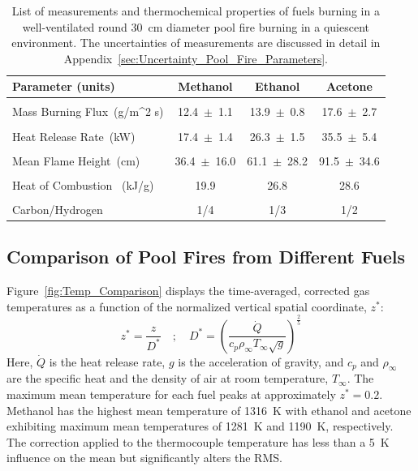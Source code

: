 \documentclass[12pt]{article}
\begin{document}
\begin{table}[!ht]
\caption{List of measurements and thermochemical properties of fuels burning in a well-ventilated round 30~cm diameter pool fire burning in a quiescent environment. The uncertainties of measurements are discussed in detail in Appendix~\ref{sec:Uncertainty_Pool_Fire_Parameters}.}
\label{tab:Pool_Fire_Parameters_Table}
\centering
	\footnotesize
	\begin{tabular}{lccc}
\hline
\textbf{Parameter (units)} &\textbf{Methanol}& \textbf{Ethanol}& \textbf{Acetone}\\
\hline
\\[0.01cm]
Mass Burning Flux~(\si{g/{m^2 s}})		&	12.4~$\pm$~1.1		&	13.9~$\pm$~0.8	&	17.6~$\pm$~2.7\\
\\[0.01cm]
Heat Release Rate~(\si{kW})			&	17.4~$\pm$~1.4		&	26.3~$\pm$~1.5	&	35.5~$\pm$~5.4\\
\\[0.01cm]
Mean Flame Height~(\si{cm})			&	36.4~$\pm$~16.0		&	61.1~$\pm$~28.2	&	91.5~$\pm$~34.6\\
\\[0.01cm]
Heat of Combustion~ (\si{kJ/g})			&	19.9				&	26.8			&	28.6			\\	
\\[0.01cm]
Carbon/Hydrogen 					&	1/4			&	1/3		&	1/2			\\
\hline
\end{tabular}
\end{table}

\subsection{Comparison of Pool Fires from Different Fuels}
\label{ssec:Fuel_comp}

Figure~\ref{fig:Temp_Comparison} displays the time-averaged, corrected gas temperatures as a function of the normalized vertical spatial coordinate, $z^*$:
\begin{equation}\label{eq:Z_Star}
z^*=\frac{z}{D^*}  \quad ; \quad  D^* = \left(\frac{\dot{Q}}{c_{p}\rho_\infty T_\infty \sqrt{g}}\right)^{\frac{2}{5}}
\end{equation}
Here, $\dot{Q}$ is the heat release rate, $g$ is the acceleration of gravity, and $c_p$ and $\rho_\infty$ are the specific heat and the density of air at room temperature, $T_\infty$. The maximum mean temperature for each fuel peaks at approximately $z^*=0.2$. Methanol has the highest mean temperature of 1316~K with ethanol and acetone exhibiting maximum mean temperatures of 1281~K and 1190~K, respectively. The correction applied to the thermocouple temperature has less than a 5~K influence on the mean but significantly alters the RMS.
\end{document}
